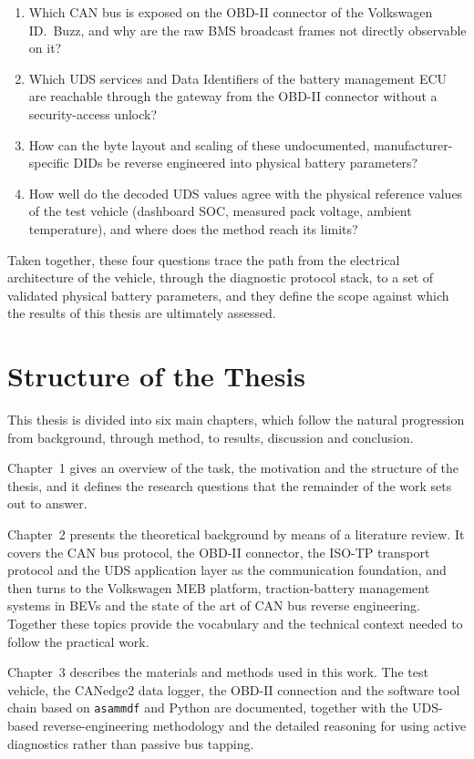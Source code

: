 \documentclass[11pt,a4paper,oneside,parskip=half]{scrreprt}
\begin{document}
\begin{enumerate}
  \item Which CAN bus is exposed on the OBD-II connector of the Volkswagen ID.~Buzz, and why are the raw BMS broadcast frames not directly observable on it?
  \item Which UDS services and Data Identifiers of the battery management ECU are reachable through the gateway from the OBD-II connector without a security-access unlock?
  \item How can the byte layout and scaling of these undocumented, manufacturer-specific DIDs be reverse engineered into physical battery parameters?
  \item How well do the decoded UDS values agree with the physical reference values of the test vehicle (dashboard SOC, measured pack voltage, ambient temperature), and where does the method reach its limits?
\end{enumerate}

Taken together, these four questions trace the path from the electrical architecture of the vehicle, through the diagnostic protocol stack, to a set of validated physical battery parameters, and they define the scope against which the results of this thesis are ultimately assessed.

\section{Structure of the Thesis}
This thesis is divided into six main chapters, which follow the natural progression from background, through method, to results, discussion and conclusion.

Chapter~1 gives an overview of the task, the motivation and the structure of the thesis, and it defines the research questions that the remainder of the work sets out to answer.

Chapter~2 presents the theoretical background by means of a literature review. It covers the CAN bus protocol, the OBD-II connector, the ISO-TP transport protocol and the UDS application layer as the communication foundation, and then turns to the Volkswagen MEB platform, traction-battery management systems in BEVs and the state of the art of CAN bus reverse engineering. Together these topics provide the vocabulary and the technical context needed to follow the practical work.

Chapter~3 describes the materials and methods used in this work. The test vehicle, the CANedge2 data logger, the OBD-II connection and the software tool chain based on \texttt{asammdf} and Python are documented, together with the UDS-based reverse-engineering methodology and the detailed reasoning for using active diagnostics rather than passive bus tapping.
\end{document}
